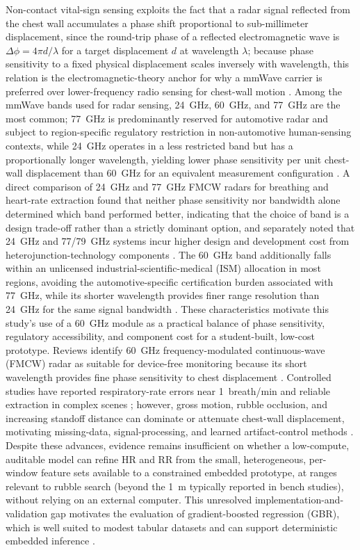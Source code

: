\documentclass[10pt,conference]{IEEEtran}
\begin{document}
Non-contact vital-sign sensing exploits the fact that a radar signal reflected from the chest wall accumulates a phase shift proportional to sub-millimeter displacement, since the round-trip phase of a reflected electromagnetic wave is $\Delta\phi = 4\pi d/\lambda$ for a target displacement $d$ at wavelength $\lambda$; because phase sensitivity to a fixed physical displacement scales inversely with wavelength, this relation is the electromagnetic-theory anchor for why a mmWave carrier is preferred over lower-frequency radio sensing for chest-wall motion \cite{alizadeh2019,zhang2023}. Among the mmWave bands used for radar sensing, 24~GHz, 60~GHz, and 77~GHz are the most common; 77~GHz is predominantly reserved for automotive radar and subject to region-specific regulatory restriction in non-automotive human-sensing contexts, while 24~GHz operates in a less restricted band but has a proportionally longer wavelength, yielding lower phase sensitivity per unit chest-wall displacement than 60~GHz for an equivalent measurement configuration \cite{infineon2026}. A direct comparison of 24~GHz and 77~GHz FMCW radars for breathing and heart-rate extraction found that neither phase sensitivity nor bandwidth alone determined which band performed better, indicating that the choice of band is a design trade-off rather than a strictly dominant option, and separately noted that 24~GHz and 77/79~GHz systems incur higher design and development cost from heterojunction-technology components \cite{singh2022}. The 60~GHz band additionally falls within an unlicensed industrial-scientific-medical (ISM) allocation in most regions, avoiding the automotive-specific certification burden associated with 77~GHz, while its shorter wavelength provides finer range resolution than 24~GHz for the same signal bandwidth \cite{infineon2026}. These characteristics motivate this study's use of a 60~GHz module as a practical balance of phase sensitivity, regulatory accessibility, and component cost for a student-built, low-cost prototype. Reviews identify 60~GHz frequency-modulated continuous-wave (FMCW) radar as suitable for device-free monitoring because its short wavelength provides fine phase sensitivity to chest displacement \cite{tahernejad2024,shastri2022}. Controlled studies have reported respiratory-rate errors near 1~breath/min and reliable extraction in complex scenes \cite{chen2024,yang2025,zhang2026}; however, gross motion, rubble occlusion, and increasing standoff distance can dominate or attenuate chest-wall displacement, motivating missing-data, signal-processing, and learned artifact-control methods \cite{qiao2025,xu2024,fusco2025}. Despite these advances, evidence remains insufficient on whether a low-compute, auditable model can refine HR and RR from the small, heterogeneous, per-window feature sets available to a constrained embedded prototype, at ranges relevant to rubble search (beyond the 1~m typically reported in bench studies), without relying on an external computer. This unresolved implementation-and-validation gap motivates the evaluation of gradient-boosted regression (GBR), which is well suited to modest tabular datasets and can support deterministic embedded inference \cite{grinsztajn2022,shwartzziv2022}.
\end{document}
